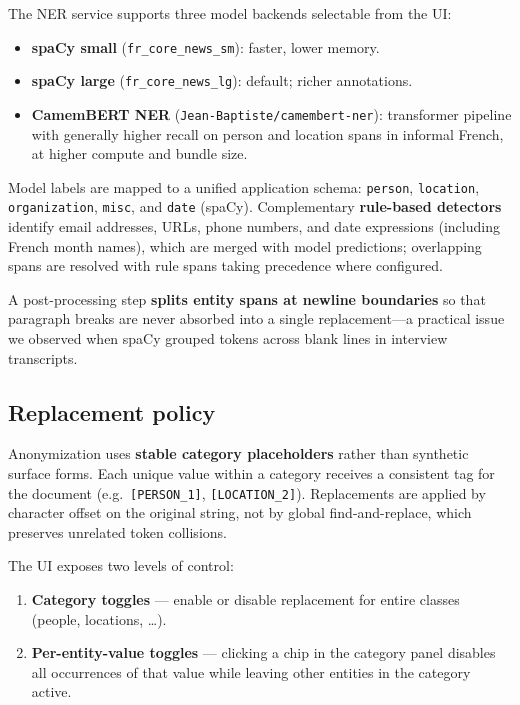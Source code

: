 \documentclass[11pt,a4paper]{article}
\begin{document}
The NER service supports three model backends selectable from the UI:
\begin{itemize}[noitemsep]
  \item \textbf{spaCy small} (\texttt{fr\_core\_news\_sm}): faster, lower memory.
  \item \textbf{spaCy large} (\texttt{fr\_core\_news\_lg}): default; richer annotations.
  \item \textbf{CamemBERT NER} (\texttt{Jean-Baptiste/camembert-ner}): transformer
        pipeline with generally higher recall on person and location spans in
        informal French, at higher compute and bundle size.
\end{itemize}

Model labels are mapped to a unified application schema:
\texttt{person}, \texttt{location}, \texttt{organization}, \texttt{misc}, and
\texttt{date} (spaCy).
Complementary \textbf{rule-based detectors} identify email addresses, URLs, phone
numbers, and date expressions (including French month names), which are merged with
model predictions; overlapping spans are resolved with rule spans taking precedence
where configured.

A post-processing step \textbf{splits entity spans at newline boundaries} so that
paragraph breaks are never absorbed into a single replacement---a practical issue we
observed when spaCy grouped tokens across blank lines in interview transcripts.

\subsection{Replacement policy}

Anonymization uses \textbf{stable category placeholders} rather than synthetic
surface forms.
Each unique value within a category receives a consistent tag for the document
(e.g.\ \texttt{[PERSON\_1]}, \texttt{[LOCATION\_2]}).
Replacements are applied by character offset on the original string, not by global
find-and-replace, which preserves unrelated token collisions.

The UI exposes two levels of control:
\begin{enumerate}[noitemsep]
  \item \textbf{Category toggles} --- enable or disable replacement for entire
        classes (people, locations, \ldots).
  \item \textbf{Per-entity-value toggles} --- clicking a chip in the category panel
        disables all occurrences of that value while leaving other entities in the
        category active.
\end{enumerate}
\end{document}

